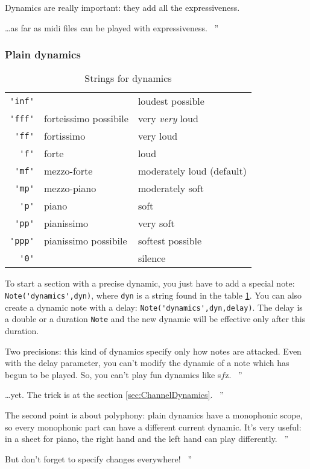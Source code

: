 \documentclass{article}
\newcommand\sfz{s$\!f\!$z\xspace}
\newenvironment{meenv}{ \par \noindent \makebox[6em][r]{ \textcolor{mecolor}{Me}: `` --~}}{~''}
\newenvironment{myselfenv}{ \par \noindent \makebox[6em][r]{ \textcolor{myselfcolor}{Myself}: `` --~}}{~''}
\newcommand{ \me }[1]{%
\begin{meenv}%
	#1%
\end{meenv} }
\newcommand{ \myself }[1]{%
\begin{myselfenv}%
	#1%
\end{myselfenv} }
\begin{document}
Dynamics are really important: they add all the expressiveness.
\me{\dots as far as midi files can be played with expressiveness.}

\subsubsection{Plain dynamics}
\label{sec:PlainDynamics}

\begin{table}
	\centering
	\begin{tabular}{rll}
		\lstinline!'inf'! & & loudest possible \\
		\lstinline!'fff'! & forteissimo possibile & very \emph{very} loud \\
		\lstinline!'ff'! & fortissimo & very loud \\
		\lstinline!'f'! & forte & loud \\
		\lstinline!'mf'! & mezzo-forte & moderately loud (default) \\
		\lstinline!'mp'! & mezzo-piano & moderately soft \\
		\lstinline!'p'! & piano & soft \\
		\lstinline!'pp'! & pianissimo & very soft \\
		\lstinline!'ppp'! & pianissimo possibile & softest possible \\
		\lstinline!'0'! & & silence \\
	\end{tabular}
	\caption{Strings for dynamics}
	\label{tab:dynamics}
\end{table}

To start a section with a precise dynamic, you just have to add a special note: \lstinline!Note('dynamics',dyn)!, where \lstinline!dyn! is a string found in the table \ref{tab:dynamics}. You can also create a dynamic note with a delay: \lstinline!Note('dynamics',dyn,delay)!. The delay is a double or a duration \lstinline!Note! and the new dynamic will be effective only after this duration.

\myself{Two precisions: this kind of dynamics specify only how notes are attacked. Even with the delay parameter, you can't modify the dynamic of a note which has begun to be played. So, you can't play fun dynamics like \sfz.}
\me{\dots yet. The trick is at the section \ref{sec:ChannelDynamics}.}
\myself{The second point is about polyphony: plain dynamics have a monophonic scope, so every monophonic part can have a different current dynamic. It's very useful: in a sheet for piano, the right hand and the left hand can play differently.}
\me{But don't forget to specify changes everywhere!}
\end{document}
